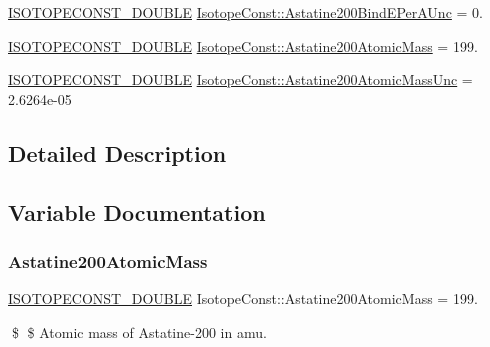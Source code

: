 \begin{DoxyCompactItemize}
\mbox{\hyperlink{group___isotope_const-_macros_ga8f45a7272ce02c0b4c65c44636ed719a}{I\+S\+O\+T\+O\+P\+E\+C\+O\+N\+S\+T\+\_\+\+D\+O\+U\+B\+LE}} \mbox{\hyperlink{group___isotope_const-_astatine-_at200_gae38544061a68a91b11e73d200dad4627}{Isotope\+Const\+::\+Astatine200\+Bind\+E\+Per\+A\+Unc}} = 0.
\item 
\mbox{\hyperlink{group___isotope_const-_macros_ga8f45a7272ce02c0b4c65c44636ed719a}{I\+S\+O\+T\+O\+P\+E\+C\+O\+N\+S\+T\+\_\+\+D\+O\+U\+B\+LE}} \mbox{\hyperlink{group___isotope_const-_astatine-_at200_gae19fcc19e423f823af1b77c8b6d41546}{Isotope\+Const\+::\+Astatine200\+Atomic\+Mass}} = 199.
\item 
\mbox{\hyperlink{group___isotope_const-_macros_ga8f45a7272ce02c0b4c65c44636ed719a}{I\+S\+O\+T\+O\+P\+E\+C\+O\+N\+S\+T\+\_\+\+D\+O\+U\+B\+LE}} \mbox{\hyperlink{group___isotope_const-_astatine-_at200_ga5538dde24f96b8aa922d4b3d3de81dbd}{Isotope\+Const\+::\+Astatine200\+Atomic\+Mass\+Unc}} = 2.\+6264e-\/05
\end{DoxyCompactItemize}


\subsection{Detailed Description}


\subsection{Variable Documentation}
\mbox{\label{group___isotope_const-_astatine-_at200_gae19fcc19e423f823af1b77c8b6d41546}} 
\subsubsection{\texorpdfstring{Astatine200\+Atomic\+Mass}{Astatine200AtomicMass}}
{\footnotesize\ttfamily \mbox{\hyperlink{group___isotope_const-_macros_ga8f45a7272ce02c0b4c65c44636ed719a}{I\+S\+O\+T\+O\+P\+E\+C\+O\+N\+S\+T\+\_\+\+D\+O\+U\+B\+LE}} Isotope\+Const\+::\+Astatine200\+Atomic\+Mass = 199.}

\$ \$ Atomic mass of Astatine-\/200 in amu. \mbox{\label{group___isotope_const-_astatine-_at200_ga5538dde24f96b8aa922d4b3d3de81dbd}} 
